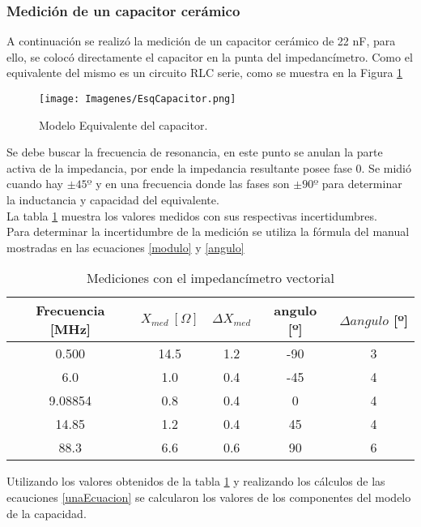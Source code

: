 \documentclass[a4paper,10pt]{article}
\begin{document}
		\subsubsection{Medición de un capacitor cerámico}
		\indent A continuación se realizó la medición de un capacitor cerámico
		de 22 nF, para ello, se colocó directamente el capacitor en la punta 
		del impedancímetro. Como el equivalente del mismo es un circuito RLC 
		serie, como se muestra en la Figura \ref{imagenCapacitor} 
		
		\begin{figure}[!htb]
			\centering
			\texttt{[image: Imagenes/EsqCapacitor.png]}
			\caption{Modelo Equivalente del capacitor.}
			\label{imagenCapacitor} 
		\end{figure}
		
		Se debe buscar la frecuencia de resonancia, en este punto se anulan la 
		parte activa de la impedancia, por ende la impedancia resultante posee
		fase 0. Se midió cuando hay $\pm 45º$ y en una frecuencia donde las fases
		son $\pm 90º$ para determinar la inductancia y capacidad del equivalente.
		\\
		\indent La tabla \ref{unaTab} muestra los valores medidos con sus 
		respectivas incertidumbres. \\
		\indent Para determinar la incertidumbre de la medición se utiliza la 
		fórmula del manual mostradas en las ecuaciones \ref{modulo} y 
		\ref{angulo}
		
		\begin{table}[!htp]
			\centering
			\begin{tabular}{|c|c|c|c|c|}
				\hline
				Frecuencia [MHz] & $X_{med}~[\Omega] $ & $\Delta X_{med}$ & 
				angulo [º] & $\Delta angulo$ [º] \\
				\hline
				0.500 & 14.5 & 1.2 & -90 & 3 \\
				\hline
				6.0 & 1.0 & 0.4 & -45 & 4 \\
				\hline
				9.08854 & 0.8 & 0.4 & 0 & 4 \\ 
				\hline
				14.85 & 1.2 & 0.4 & 45 & 4 \\
				\hline
				88.3 & 6.6 & 0.6 & 90 & 6 \\ 
				\hline									
			\end{tabular}
			\caption{Mediciones con el impedancímetro vectorial} \label{unaTab}
		\end{table}

		\indent Utilizando los valores obtenidos de la tabla \ref{unaTab} y 
		realizando los cálculos de las ecauciones \ref{unaEcuacion} se 
		calcularon los valores de los componentes del modelo de la capacidad. \\
		
\end{document}
